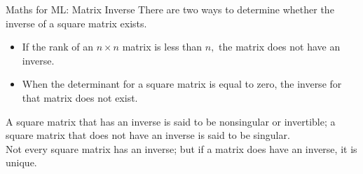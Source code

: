 \documentclass{beamer}
\begin{document}
\begin{frame}{Maths for ML: Matrix Inverse}
There are two ways to determine whether the inverse of a square matrix exists.

\pause 
\begin{itemize}[<+->]
	\item If the rank of an $n \times n$ matrix is less than $n,$ the matrix does not have an inverse.
	\item When the determinant for a square matrix is equal to zero, the inverse for that matrix does not exist.
\end{itemize}
\pause A square matrix that has an inverse is said to be nonsingular or invertible; a square matrix that does not have an inverse is said to be singular. \\
\pause Not every square matrix has an inverse; but if a matrix does have an inverse, it is unique.

\end{frame}
\end{document}
